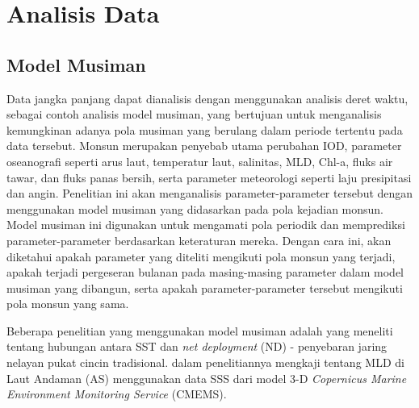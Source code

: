 \section[Analisis Data]{Analisis Data}
\begin{spacing}{1.5}
	\subsection[Model Musiman]{Model Musiman}

	Data jangka panjang dapat dianalisis dengan menggunakan analisis deret waktu, sebagai contoh analisis model musiman, yang bertujuan untuk menganalisis kemungkinan adanya pola musiman yang berulang dalam periode tertentu pada data tersebut. Monsun merupakan penyebab utama perubahan IOD, parameter oseanografi seperti arus laut, temperatur laut, salinitas, MLD, Chl-a, fluks air tawar, dan fluks panas bersih, serta parameter meteorologi seperti laju presipitasi dan angin. Penelitian ini akan menganalisis parameter-parameter tersebut dengan menggunakan model musiman yang didasarkan pada pola kejadian monsun. Model musiman ini digunakan untuk mengamati pola periodik dan memprediksi parameter-parameter berdasarkan keteraturan mereka. Dengan cara ini, akan diketahui apakah parameter yang diteliti mengikuti pola monsun yang terjadi, apakah terjadi pergeseran bulanan pada masing-masing parameter dalam model musiman yang dibangun, serta apakah parameter-parameter tersebut mengikuti pola monsun yang sama.

	Beberapa penelitian yang menggunakan model musiman adalah  \citeyear{Haridhi2016} yang meneliti tentang hubungan antara SST dan \textit{net deployment} (ND) - penyebaran jaring nelayan pukat cincin tradisional.  \citeyear{Ikhwan2022} dalam penelitiannya mengkaji tentang MLD di Laut Andaman (AS) menggunakan data SSS dari model 3-D \textit{Copernicus Marine Environment Monitoring Service} (CMEMS).  
	

\end{spacing}
